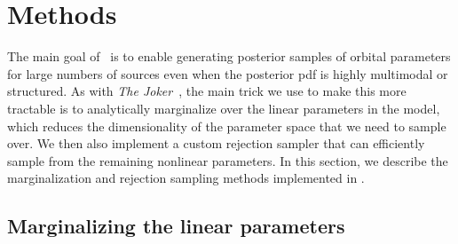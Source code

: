 \documentclass[twocolumn]{AASTeX7/aastex701}
\newcommand{\harv}{\package{harv}}
\newcommand{\joker}{\textsl{The Joker}}
\begin{document}
\section{Methods}
\label{sec:methods}

The main goal of \harv\ is to enable generating posterior samples of orbital parameters
for large numbers of sources even when the posterior pdf is highly multimodal or
structured.
As with \joker\ \citep{Price-Whelan:2017}, the main trick we use to make this more
tractable is to analytically marginalize over the linear parameters in the model, which
reduces the dimensionality of the parameter space that we need to sample over.
We then also implement a custom rejection sampler that can efficiently sample from the
remaining nonlinear parameters.
In this section, we describe the marginalization and rejection sampling methods
implemented in \harv.

\subsection{Marginalizing the linear parameters}
\label{sec:methods-marginal}
\end{document}
